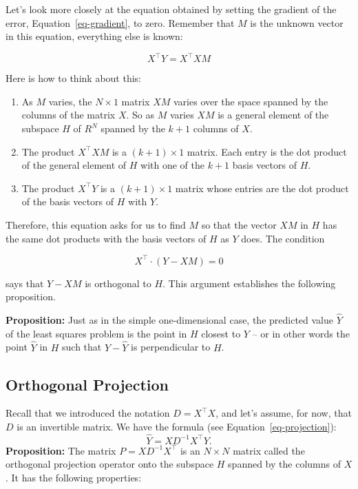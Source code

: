 \documentclass[
  11pt,
  letterpaper,
]{scrbook}
\theoremstyle{plain}
\theoremstyle{plain}
\theoremstyle{remark}
\begin{document}
Let's look more closely at the equation obtained by setting the gradient
of the error, Equation~\ref{eq-gradient}, to zero. Remember that \(M\)
is the unknown vector in this equation, everything else is known:

\[ X^{\intercal}Y = X^{\intercal}XM \]

Here is how to think about this:

\begin{enumerate}
\def\labelenumi{\arabic{enumi}.}
\item
  As \(M\) varies, the \(N\times 1\) matrix \(XM\) varies over the space
  spanned by the columns of the matrix \(X\). So as \(M\) varies \(XM\)
  is a general element of the subspace \(H\) of \(R^{N}\) spanned by the
  \(k+1\) columns of \(X\).
\item
  The product \(X^{\intercal}XM\) is a \((k+1)\times 1\) matrix. Each
  entry is the dot product of the general element of \(H\) with one of
  the \(k+1\) basis vectors of \(H\).
\item
  The product \(X^{\intercal}Y\) is a \((k+1)\times 1\) matrix whose
  entries are the dot product of the basis vectors of \(H\) with \(Y\).
\end{enumerate}

Therefore, this equation asks for us to find \(M\) so that the vector
\(XM\) in \(H\) has the same dot products with the basis vectors of
\(H\) as \(Y\) does. The condition

\[ X^{\intercal}\cdot (Y-XM)=0 \]

says that \(Y-XM\) is orthogonal to \(H\). This argument establishes the
following proposition.

\textbf{Proposition:} Just as in the simple one-dimensional case, the
predicted value \(\hat{Y}\) of the least squares problem is the point in
\(H\) closest to \(Y\) -- or in other words the point \(\hat{Y}\) in
\(H\) such that \(Y-\hat{Y}\) is perpendicular to \(H\).

\hypertarget{orthogonal-projection}{%
\subsection{Orthogonal Projection}\label{orthogonal-projection}}

Recall that we introduced the notation \(D=X^{\intercal}X\), and let's
assume, for now, that \(D\) is an invertible matrix. We have the formula
(see Equation~\ref{eq-projection}):
\[ \hat{Y} = XD^{-1}X^{\intercal}Y.  \] \textbf{Proposition:} The matrix
\(P=XD^{-1}X^{\intercal}\) is an \(N\times N\) matrix called the
orthogonal projection operator onto the subspace \(H\) spanned by the
columns of \(X\). It has the following properties:
\end{document}
